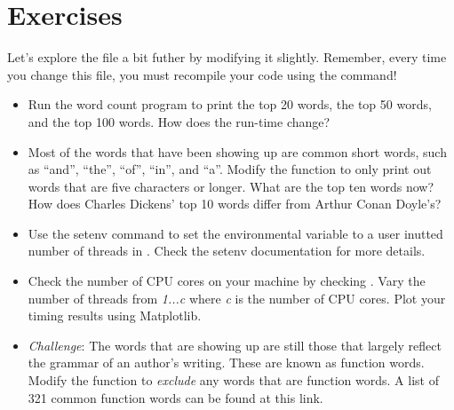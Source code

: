 \documentclass[letterpaper,10pt,openany,oneside]{sphinxmanual}
\begin{document}
\section{Exercises}
\label{phoenix/phoenix:exercises}
Let's explore the  file a bit futher by modifying it slightly.
Remember, every time you change this file, you must recompile your code using
the  command!
\begin{itemize}
\item {} 
Run the word count program to print the top 20 words, the top 50 words, and
the top 100 words. How does the run-time change?

\item {} 
Most of the words that have been showing up are common short words, such as
``and'', ``the'', ``of'', ``in'', and ``a''. Modify the  function to only
print out words that are five characters or longer. What are the top ten
words now? How does Charles Dickens' top 10 words differ from Arthur Conan
Doyle's?

\item {} 
Use the setenv command to set the  environmental variable to
a user inutted number of threads in . Check the setenv
documentation for more details.

\item {} 
Check the number of CPU cores on your machine by checking .
Vary the number of threads from \emph{1...c} where \emph{c} is the number of CPU cores.
Plot your timing results using Matplotlib.

\item {} 
\emph{Challenge}: The words that are showing up are still those that largely
reflect the grammar of an author's writing. These are known as function words.
Modify the  function to \emph{exclude} any words that are function words.
A list of 321 common function words can be found at this link.

\end{itemize}



\renewcommand{\indexname}{Index}
\printindex
\end{document}
